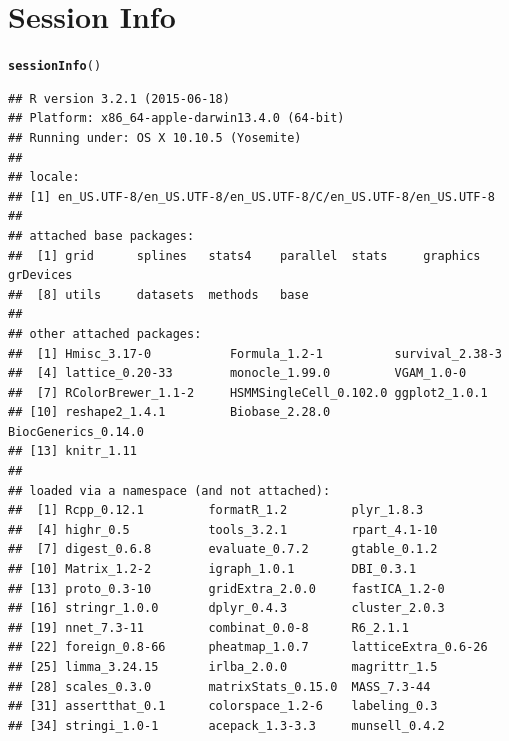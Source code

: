 \documentclass[10pt,oneside]{article}\usepackage[]{graphicx}\usepackage[]{color}
\makeatletter
\newcommand{\hlstd}[1]{\textcolor[rgb]{0.345,0.345,0.345}{#1}}%
\newcommand{\hlkwd}[1]{\textcolor[rgb]{0.737,0.353,0.396}{\textbf{#1}}}%
\newenvironment{kframe}{%
 \def\at@end@of@kframe{}%
 \ifinner\ifhmode%
  \def\at@end@of@kframe{\end{minipage}}%
  \begin{minipage}{\columnwidth}%
 \fi\fi%
 \def\FrameCommand##1{\hskip\@totalleftmargin \hskip-\fboxsep
 \colorbox{shadecolor}{##1}\hskip-\fboxsep
     \hskip-\linewidth \hskip-\@totalleftmargin \hskip\columnwidth}%
 \MakeFramed {\advance\hsize-\width
   \@totalleftmargin\z@ \linewidth\hsize
   \@setminipage}}%
 {\par\unskip\endMakeFramed%
 \at@end@of@kframe}
\newenvironment{knitrout}{}{} %
\makeatother
\begin{document}
\section{Session Info}
\begin{knitrout}
\color{fgcolor}\begin{kframe}
\begin{alltt}
\hlkwd{sessionInfo}\hlstd{()}
\end{alltt}
\begin{verbatim}
## R version 3.2.1 (2015-06-18)
## Platform: x86_64-apple-darwin13.4.0 (64-bit)
## Running under: OS X 10.10.5 (Yosemite)
## 
## locale:
## [1] en_US.UTF-8/en_US.UTF-8/en_US.UTF-8/C/en_US.UTF-8/en_US.UTF-8
## 
## attached base packages:
##  [1] grid      splines   stats4    parallel  stats     graphics  grDevices
##  [8] utils     datasets  methods   base     
## 
## other attached packages:
##  [1] Hmisc_3.17-0           Formula_1.2-1          survival_2.38-3       
##  [4] lattice_0.20-33        monocle_1.99.0         VGAM_1.0-0            
##  [7] RColorBrewer_1.1-2     HSMMSingleCell_0.102.0 ggplot2_1.0.1         
## [10] reshape2_1.4.1         Biobase_2.28.0         BiocGenerics_0.14.0   
## [13] knitr_1.11            
## 
## loaded via a namespace (and not attached):
##  [1] Rcpp_0.12.1         formatR_1.2         plyr_1.8.3         
##  [4] highr_0.5           tools_3.2.1         rpart_4.1-10       
##  [7] digest_0.6.8        evaluate_0.7.2      gtable_0.1.2       
## [10] Matrix_1.2-2        igraph_1.0.1        DBI_0.3.1          
## [13] proto_0.3-10        gridExtra_2.0.0     fastICA_1.2-0      
## [16] stringr_1.0.0       dplyr_0.4.3         cluster_2.0.3      
## [19] nnet_7.3-11         combinat_0.0-8      R6_2.1.1           
## [22] foreign_0.8-66      pheatmap_1.0.7      latticeExtra_0.6-26
## [25] limma_3.24.15       irlba_2.0.0         magrittr_1.5       
## [28] scales_0.3.0        matrixStats_0.15.0  MASS_7.3-44        
## [31] assertthat_0.1      colorspace_1.2-6    labeling_0.3       
## [34] stringi_1.0-1       acepack_1.3-3.3     munsell_0.4.2
\end{verbatim}
\end{kframe}
\end{knitrout}



\end{document}
